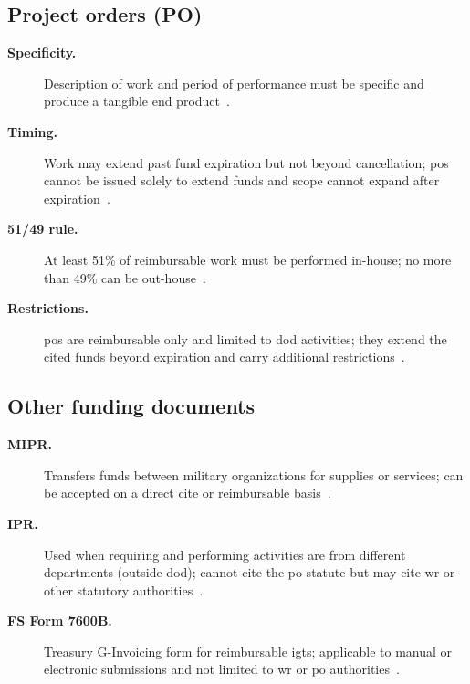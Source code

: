 \documentclass[../main.tex]{subfiles}
\begin{document}
\subsection{Project orders (PO)}
\begin{description}
  \item[\textbf{Specificity.}] Description of work and period of performance must be specific and produce a tangible end product~\autocite{edo-3-1-5-field-activity-fm-2025,DoDFMR-Vol11A-Ch2}.
  \item[\textbf{Timing.}] Work may extend past fund expiration but not beyond cancellation; \acp{po} cannot be issued solely to extend funds and scope cannot expand after expiration~\autocite{edo-3-1-5-field-activity-fm-2025,DoDFMR-Vol11A-Ch2}.
  \item[\textbf{51/49 rule.}] At least 51\% of reimbursable work must be performed in-house; no more than 49\% can be out-house~\autocite{edo-3-1-5-field-activity-fm-2025,DoDFMR-Vol11A-Ch2}.
  \item[\textbf{Restrictions.}] \acp{po} are reimbursable only and limited to \ac{dod} activities; they extend the cited funds beyond expiration and carry additional restrictions~\autocite{edo-3-1-5-field-activity-fm-2025,DoDFMR-Vol11A-Ch2}.
\end{description}

\subsection{Other funding documents}
\begin{description}
  \item[\textbf{MIPR.}] Transfers funds between military organizations for supplies or services; can be accepted on a direct cite or reimbursable basis~\autocite{edo-3-1-5-field-activity-fm-2025}.
  \item[\textbf{IPR.}] Used when requiring and performing activities are from different departments (outside \ac{dod}); cannot cite the \ac{po} statute but may cite \ac{wr} or other statutory authorities~\autocite{edo-3-1-5-field-activity-fm-2025}.
  \item[\textbf{FS Form 7600B.}] Treasury G-Invoicing form for reimbursable \acp{igt}; applicable to manual or electronic submissions and not limited to \ac{wr} or \ac{po} authorities~\autocite{edo-3-1-5-field-activity-fm-2025}.
\end{description}
\end{document}
